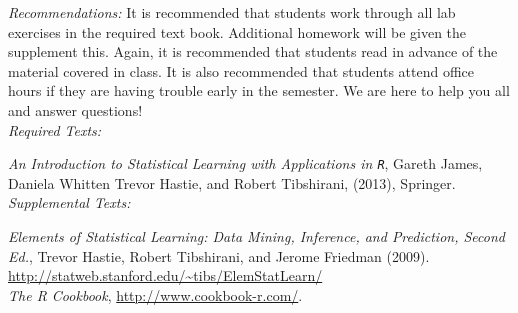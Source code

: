 \documentclass[11pt]{article}
\begin{document}
\emph{Recommendations:} It is recommended that students work through all lab exercises in the required text book. Additional homework will be given the supplement this. Again, it is recommended that students read in advance of the material covered in class. It is also recommended that students attend office hours if they are having trouble early in the semester. We are here to help you all and answer questions! \\

\emph{Required Texts:} 

\emph{An Introduction to Statistical Learning with Applications in \texttt{R}}, Gareth James, Daniela Whitten Trevor Hastie, and Robert Tibshirani, (2013), Springer.\\

\emph{Supplemental Texts:} 


\emph{Elements of Statistical Learning: Data Mining, Inference, and Prediction, Second Ed.}, Trevor Hastie, Robert Tibshirani, and Jerome Friedman (2009). \url{http://statweb.stanford.edu/~tibs/ElemStatLearn/}\\

\emph{The R Cookbook}, \url{http://www.cookbook-r.com/}.





\end{document}
